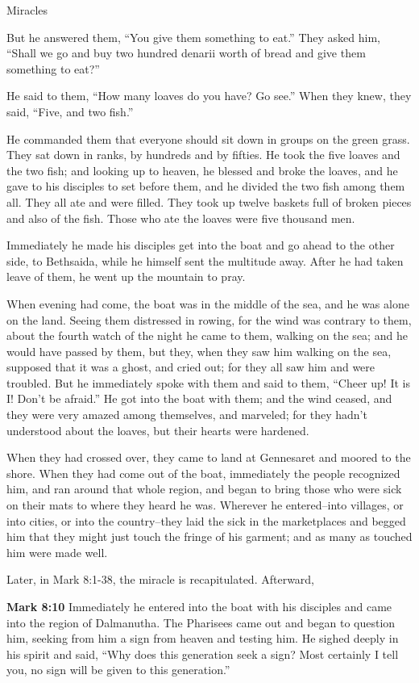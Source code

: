 \documentclass[10pt,twoside]{book}
\newcommand{\quotesize}{\normalsize{}}
\newcommand{\comm}[1]{\begingroup \color{black!50} #1\endgroup}
\newenvironment{quotetext}{\begingroup\quotesize}{\endgroup}
\newcommand{\bible}[2]{\begin{quotetext}\textbf{#1} #2\end{quotetext}}
\newcommand{\gospelmark}[2]{\bible{Mark #1}{#2}}
\begin{document}
\begin{section}{Miracles}
{  But he answered them, ``You give them something to eat.''
They asked him, ``Shall we go and buy two hundred denarii worth of bread and give them something to eat?''

  He said to them, ``How many loaves do you have? Go see.''
When they knew, they said, ``Five, and two fish.''

  He commanded them that everyone should sit down in groups on the green grass.   They sat down in ranks, by hundreds and by fifties.   He took the five loaves and the two fish; and looking up to heaven, he blessed and broke the loaves, and he gave to his disciples to set before them, and he divided the two fish among them all.   They all ate and were filled.   They took up twelve baskets full of broken pieces and also of the fish.   Those who ate the loaves were five thousand men.

  Immediately he made his disciples get into the boat and go ahead to the other side, to Bethsaida, while he himself sent the multitude away.   After he had taken leave of them, he went up the mountain to pray.

  When evening had come, the boat was in the middle of the sea, and he was alone on the land.   Seeing them distressed in rowing, for the wind was contrary to them, about the fourth watch of the night he came to them, walking on the sea;  and he would have passed by them,   but they, when they saw him walking on the sea, supposed that it was a ghost, and cried out;   for they all saw him and were troubled. But he immediately spoke with them and said to them, ``Cheer up! It is I! Don't be afraid.''   He got into the boat with them; and the wind ceased, and they were very amazed among themselves, and marveled;   for they hadn't understood about the loaves, but their hearts were hardened.

  When they had crossed over, they came to land at Gennesaret and moored to the shore.   When they had come out of the boat, immediately the people recognized him,   and ran around that whole region, and began to bring those who were sick on their mats to where they heard he was.   Wherever he entered--into villages, or into cities, or into the country--they laid the sick in the marketplaces and begged him that they might just touch the fringe of his garment; and as many as touched him were made well.
}

\comm{Later, in Mark 8:1-38, the miracle is recapitulated. Afterward,}

\gospelmark{8:10}{
Immediately he entered into the boat with his disciples and came into the region of Dalmanutha.   The Pharisees came out and began to question him, seeking from him a sign from heaven and testing him.   He sighed deeply in his spirit and said, ``Why does this generation seek a sign? Most certainly I tell you, no sign will be given to this generation.''
}


\end{section}
\end{document}
